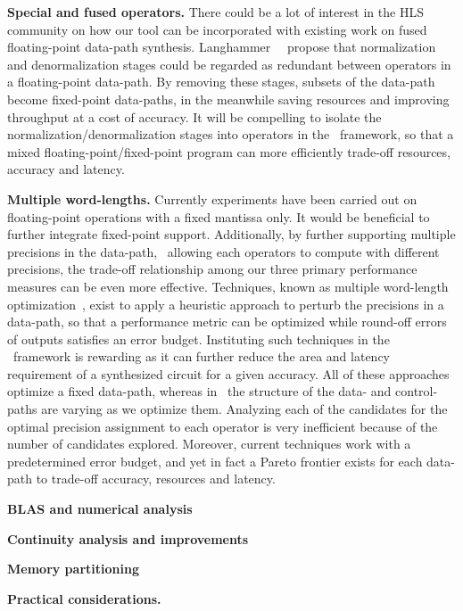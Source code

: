 \textbf{Special and fused operators.} There could be a lot of interest in the
HLS community on how our tool can be incorporated with existing work on fused
floating-point data-path synthesis.  Langhammer~\etal~\cite{langhammer} propose
that normalization and denormalization stages could be regarded as redundant
between operators in a floating-point data-path.  By removing these stages,
subsets of the data-path become fixed-point data-paths, in the meanwhile
saving resources and improving throughput at a cost of accuracy.  It will be
compelling to isolate the normalization/denormalization stages into operators
in the \soap~framework, so that a mixed floating-point/fixed-point program can
more efficiently trade-off resources, accuracy and latency.

\textbf{Multiple word-lengths.}  Currently experiments have been carried
out on floating-point operations with a fixed mantissa only.  It would be
beneficial to further integrate fixed-point support.  Additionally, by further
supporting multiple precisions in the data-path, \ie~allowing each operators to
compute with different precisions, the trade-off relationship among our three
primary performance measures can be even more effective.  Techniques, known
as multiple word-length optimization~\cite{constantinides, lee06, cantin02},
exist to apply a heuristic approach to perturb the precisions in a data-path,
so that a performance metric can be optimized while round-off errors of outputs
satisfies an error budget.  Instituting such techniques in the \soap~framework
is rewarding as it can further reduce the area and latency requirement of a
synthesized circuit for a given accuracy.  All of these approaches optimize a
fixed data-path, whereas in \soap~the structure of the data- and control-paths
are varying as we optimize them.  Analyzing each of the candidates for the
optimal precision assignment to each operator is very inefficient because of
the number of candidates explored.  Moreover, current techniques work with a
predetermined error budget, and yet in fact a Pareto frontier exists for each
data-path to trade-off accuracy, resources and latency.

\textbf{BLAS and numerical analysis}

\textbf{Continuity analysis and improvements}

\textbf{Memory partitioning}

\textbf{Practical considerations.}
